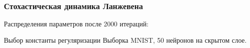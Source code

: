 \documentclass[10pt,pdf,utf8,russian,aspectratio=169]{beamer}
\begin{document}
\begin{frame}
\frametitle{Стохастическая динамика Ланжевена}
Распределения параметров после 2000 итераций:
\begin{figure}[h]
\centering
{}
\end{figure}

\end{frame}

\begin{frame}{Выбор константы регуляризации}
Выборка MNIST, 50 нейронов на скрытом слое.

\begin{figure}
  \centering
\label{fig:1}\qquad
\end{figure}

\end{frame}
\end{document}
